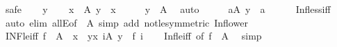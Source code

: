 \begin{isabellebody}
%
\isadelimproof
%
\endisadelimproof
%
\isatagproof
{}\isamarkupfalse%
\ safe\isanewline
\ \ \isamarkupfalse%
\ y\isanewline
\ \ \isamarkupfalse%
\ {\isachardoublequoteopen}x\ {\isasymge}\ {\isasymSqinter}A{\isachardoublequoteclose}\ {\isachardoublequoteopen}y\ {\isachargreater}{\kern0pt}\ x{\isachardoublequoteclose}\isanewline
\ \ \isamarkupfalse%
\ \isamarkupfalse%
\ {\isachardoublequoteopen}y\ {\isachargreater}{\kern0pt}\ {\isasymSqinter}A{\isachardoublequoteclose}\ \isamarkupfalse%
\ auto\isanewline
\ \ \isamarkupfalse%
\ \isamarkupfalse%
\ {\isachardoublequoteopen}{\isasymexists}a{\isasymin}A{\isachardot}{\kern0pt}\ y\ {\isachargreater}{\kern0pt}\ a{\isachardoublequoteclose}\isanewline
\ \ \ \ \isamarkupfalse%
\ Inf{\isacharunderscore}{\kern0pt}less{\isacharunderscore}{\kern0pt}iff\ \isacommand{{\isachardot}{\kern0pt}}\isamarkupfalse%
\isanewline
{}\isamarkupfalse%
\ {\isacharparenleft}{\kern0pt}auto\ elim{\isacharbang}{\kern0pt}{\isacharcolon}{\kern0pt}\ allE{\isacharbrackleft}{\kern0pt}of\ {\isacharunderscore}{\kern0pt}\ {\isachardoublequoteopen}{\isasymSqinter}A{\isachardoublequoteclose}{\isacharbrackright}{\kern0pt}\ simp\ add{\isacharcolon}{\kern0pt}\ not{\isacharunderscore}{\kern0pt}le{\isacharbrackleft}{\kern0pt}symmetric{\isacharbrackright}{\kern0pt}\ Inf{\isacharunderscore}{\kern0pt}lower{\isacharparenright}{\kern0pt}%
\endisatagproof
{\isafoldproof}%
%
\isadelimproof
\isanewline
%
\endisadelimproof
\isanewline
{}\isamarkupfalse%
\ INF{\isacharunderscore}{\kern0pt}le{\isacharunderscore}{\kern0pt}iff{\isacharcolon}{\kern0pt}\ {\isachardoublequoteopen}{\isasymSqinter}{\isacharparenleft}{\kern0pt}f\ {\isacharbackquote}{\kern0pt}\ A{\isacharparenright}{\kern0pt}\ {\isasymle}\ x\ {\isasymlongleftrightarrow}\ {\isacharparenleft}{\kern0pt}{\isasymforall}y{\isachargreater}{\kern0pt}x{\isachardot}{\kern0pt}\ {\isasymexists}i{\isasymin}A{\isachardot}{\kern0pt}\ y\ {\isachargreater}{\kern0pt}\ f\ i{\isacharparenright}{\kern0pt}{\isachardoublequoteclose}\isanewline
%
\isadelimproof
\ \ %
\endisadelimproof
%
\isatagproof
{}\isamarkupfalse%
\ Inf{\isacharunderscore}{\kern0pt}le{\isacharunderscore}{\kern0pt}iff\ {\isacharbrackleft}{\kern0pt}of\ {\isachardoublequoteopen}f\ {\isacharbackquote}{\kern0pt}\ A{\isachardoublequoteclose}{\isacharbrackright}{\kern0pt}\ \isamarkupfalse%
\ simp%
\endisatagproof
{\isafoldproof}%
%
\isadelimproof
\isanewline

\end{isabellebody}
